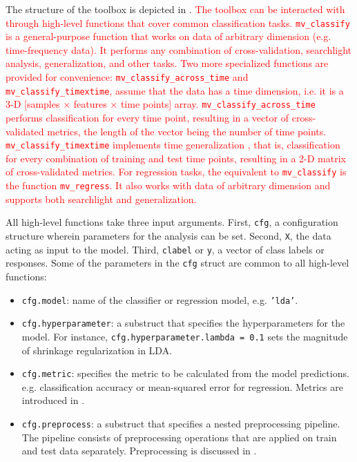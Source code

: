 \documentclass[utf8]{frontiersSCNS} %
\newcommand{\ttt}[1]{\texttt{#1}}
\newcommand{\red}[1]{\textcolor{red}{#1}}
\begin{document}
The structure of the toolbox is depicted in . \red{The toolbox can be interacted with through high-level functions that cover common classification tasks. \ttt{mv\_classify} is a  general-purpose function that works on data of arbitrary dimension (e.g. time-frequency data). It performs any combination of cross-validation, searchlight analysis, generalization, and other tasks. Two more specialized functions are provided for convenience: \ttt{mv\_classify\_across\_time}  and \ttt{mv\_classify\_timextime}, assume that the data has a time dimension, i.e. it is a 3-D [samples $\times$ features $\times$ time points] array. \ttt{mv\_classify\_across\_time} performs classification for every time point, resulting in a vector of cross-validated metrics, the length of the vector being the number of time points. \ttt{mv\_classify\_timextime} implements time generalization \citep{King2014}, that is, classification for every combination of training and test time points, resulting in a 2-D matrix of cross-validated metrics. For regression tasks, the equivalent to \ttt{mv\_classify} is the function \ttt{mv\_regress}. It also works with data of arbitrary dimension and supports both searchlight and generalization.}

All high-level functions take three input arguments. First, \ttt{cfg}, a configuration structure wherein parameters for the analysis can be set. Second, \ttt{X}, the data acting as input to the model. Third, \ttt{clabel} or \ttt{y}, a vector of class labels or responses. Some of the parameters in the \ttt{cfg} struct are common  to all high-level functions:

\begin{itemize}
    \item \ttt{cfg.model}: name of the classifier or regression model, e.g. \ttt{'lda'}.
    \item \ttt{cfg.hyperparameter}: a substruct that specifies the hyperparameters for the model. For instance, \ttt{cfg.hyperparameter.lambda = 0.1} sets the magnitude of shrinkage regularization in LDA.
    \item \ttt{cfg.metric}: specifies the metric to be calculated from the model predictions. e.g. classification accuracy or mean-squared error for regression. Metrics are introduced in .
    \item \ttt{cfg.preprocess}: a substruct that specifies a nested preprocessing pipeline. The pipeline consists of preprocessing operations that are applied on train and test data separately. Preprocessing is discussed in .
\end{itemize}
\end{document}
